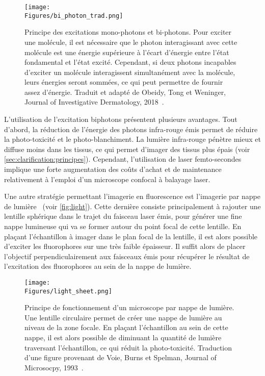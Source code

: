 \documentclass[\main/main.tex]{subfiles}
\begin{document}
\begin{figure}[h!]{\textwidth} 
    \centering
       \centering \texttt{[image: \\Figures/bi\_photon\_trad.png]}
       \caption{
            \label{fig:biphoton}
            Principe des excitations mono\hyp{}photons et bi\hyp{}photons.
            \newline
            Pour exciter une molécule, il est nécessaire que le photon interagissant avec cette molécule est une énergie supérieure à l'écart d'énergie entre l'état fondamental et l'état excité.
            Cependant, si deux photons incapables d'exciter un molécule interagissent simultanément avec la molécule, leurs énergies seront sommées, ce qui peut permettre de fournir assez d'énergie. 
            \newline
            Traduit et adapté de Obeidy, Tong et Weninger, Journal of Investigative Dermatology, 2018~\cite{obeidy_2018}.
            }
\end{figure}

%
L'utilisation de l'excitation biphotons présentent plusieurs avantages. Tout d'abord, la réduction de l'énergie des photons infra\hyp{}rouge émis permet de réduire la photo\hyp{}toxicité et le photo\hyp{}blanchiment.
%
La lumière infra\hyp{}rouge pénètre mieux et diffuse moins dans les tissus, ce qui permet d'imager des tissus plus épais (voir \autoref{sec:clarification:principes}).
%
Cependant, l'utilisation de laser femto\hyp{}secondes implique une forte augmentation des coûts d'achat et de maintenance relativement à l'emploi d'un microscope confocal à balayage laser.


Une autre stratégie permettant l'imagerie en fluorescence est l'imagerie par nappe de lumière~\cite{voie_1993} (voir \autoref{fig:light}). Cette dernière consiste principalement à rajouter une lentille sphérique dans le trajet du faisceau laser émis, pour générer une fine nappe lumineuse qui va se former autour du point focal de cette lentille.
%
En plaçant l'échantillon à imager dans le plan focal de la lentille,
il est alors possible d'exciter les fluorophores sur une très faible épaisseur.
%
Il suffit alors de placer l'objectif perpendiculairement aux faisceaux émis pour récupérer le résultat de l'excitation des fluorophores au sein de la nappe de lumière.

\begin{figure}[h!]{\textwidth} 
    \centering
       \centering \texttt{[image: \\Figures/light\_sheet.png]}
       \caption{
            \label{fig:light}
            Principe de fonctionnement d'un microscope par nappe de lumière.
            \newline
            Une lentille circulaire permet de créer une nappe de lumière au niveau de la zone focale.
            En plaçant l'échantillon au sein de cette nappe, il est alors possible de diminuant la quantité de lumière traversant l'échantillon, ce qui réduit la photo\hyp{}toxicité. 
            \newline
            Traduction d'une figure provenant de Voie, Burns et Spelman, Journal of Microsocpy, 1993~\cite{voie_1993}.
            }
\end{figure}
\end{document}
